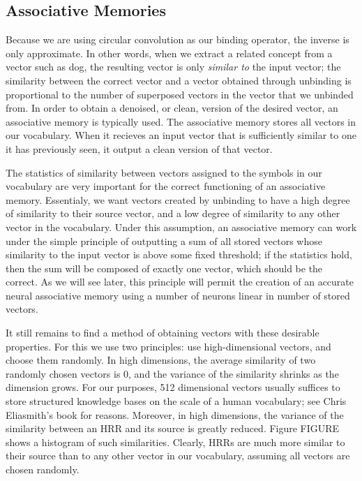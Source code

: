 \documentclass[10pt,letterpaper]{article}
\begin{document}
\subsection{Associative Memories}
Because we are using circular convolution as our binding operator, the inverse is only approximate. In other words, when we extract a related concept from a vector such as dog, the resulting vector is only \textit{similar to} the input vector; the similarity between the correct vector and a vector obtained through unbinding is proportional to the number of superposed vectors in the vector that we unbinded from. In order to obtain a denoised, or clean, version of the desired vector, an associative memory is typically used. The associative memory stores all vectors in our vocabulary. When it recieves an input vector that is sufficiently similar to one it has previously seen, it output a clean version of that vector.

The statistics of similarity between vectors assigned to the symbols in our vocabulary are very important for the correct functioning of an associative memory. Essentialy, we want vectors created by unbinding to have a high degree of similarity to their source vector, and a low degree of similarity to any other vector in the vocabulary. Under this assumption, an associative memory can work under the simple principle of outputting a sum of all stored vectors whose similarity to the input vector is above some fixed threshold; if the statistics hold, then the sum will be composed of exactly one vector, which should be the correct. As we will see later, this principle will permit the creation of an accurate neural associative memory using a number of neurons linear in number of stored vectors.

It still remains to find a method of obtaining vectors with these desirable properties. For this we use two principles: use high-dimensional vectors, and choose them randomly. In high dimensions, the average similarity of two randomly chosen vectors is 0, and the variance of the similarity shrinks as the dimension grows. For our purposes, 512 dimensional vectors usually suffices to store structured knowledge bases on the scale of a human vocabulary; see Chris Eliasmith's book for reasons.
Moreover, in high dimensions, the variance of the similarity between an HRR and its source is greatly reduced. Figure FIGURE shows a histogram of such similarities. Clearly, HRRs are much more similar to their source than to any other vector in our vocabulary, assuming all vectors are chosen randomly.
\end{document}
